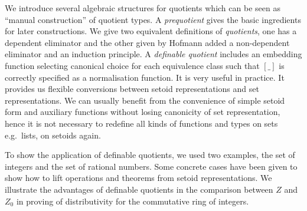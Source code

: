 We introduce several
algebraic structures for quotients which can be seen as ``manual construction'' of quotient types.
A \emph{prequotient} gives the basic ingredients for later
constructions. We give two equivalent definitions of \emph{quotients},
one has a dependent eliminator and the other given by Hofmann added
 a non-dependent eliminator and an induction principle.
A \emph{definable quotient} includes an embedding function selecting canonical choice for each
equivalence class such that $[\_]$ is correctly specified as a normalisation function. 
It is very useful in practice.
It provides us flexible conversions between setoid representations and set representations.
We can usually benefit from the convenience of simple setoid form and auxiliary functions without losing canonicity of set representation, hence it is not necessary to redefine all kinds of functions and types on sets e.g.\ lists, on setoids again.

To show the application of definable quotients, we
used two examples, the set of integers and the set of rational
numbers. Some concrete cases have been given to show how to lift operations and theorems from setoid representations.
We illustrate the advantages of definable quotients in the comparison between $Z$ and $Z_0$ in proving of distributivity for the commutative ring of integers.




